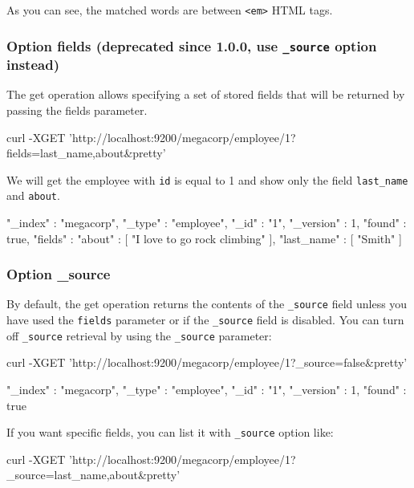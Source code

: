 \documentclass{article}%
\begin{document}
As you can see, the matched words are between \texttt{<em>} HTML tags.

\subsubsection{Option fields (deprecated since 1.0.0, use \texttt{\_source} option instead)}

The get operation allows specifying a set of stored fields that will be returned by passing the fields parameter.

\begin{command}
curl -XGET 'http://localhost:9200/megacorp/employee/1?fields=last_name,about&pretty'
\end{command}

We will get the employee with \texttt{id} is equal to 1 and show only the field \texttt{last\_name} and \texttt{about}.

\begin{command}
{
	"_index" : "megacorp",
	"_type" : "employee",
	"_id" : "1",
	"_version" : 1,
	"found" : true,
	"fields" : {
		"about" : [ "I love to go rock climbing" ],
		"last_name" : [ "Smith" ]
	}
}
\end{command}

\subsubsection{Option \_source}

By default, the get operation returns the contents of the \texttt{\_source} field unless you have used the \texttt{fields} parameter or if the \texttt{\_source} field is disabled. You can turn off \texttt{\_source} retrieval by using the \texttt{\_source} parameter:

\begin{command}
curl -XGET 'http://localhost:9200/megacorp/employee/1?_source=false&pretty'
\end{command}

\begin{command}
{
	"_index" : "megacorp",
	"_type" : "employee",
	"_id" : "1",
	"_version" : 1,
	"found" : true
}
\end{command}

If you want specific fields, you can list it with \texttt{\_source} option like:

\begin{command}
curl -XGET 'http://localhost:9200/megacorp/employee/1?_source=last_name,about&pretty'
\end{command}
\end{document}
